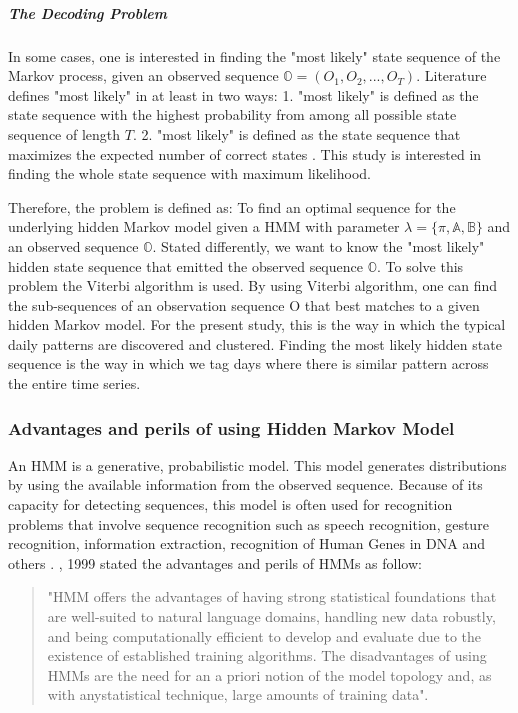 \subparagraph{The Decoding Problem}
\label{sec:decoding_HMM}

In some cases, one is interested in finding the "most likely" state sequence of the Markov process, given an observed sequence $\mathbb{O} = (O_1,O_2, ...,O_T ) $. Literature defines "most likely" in at least in two ways: 1. "most likely" is defined as the state sequence with the highest probability from among all possible state sequence of length $T$. 2. "most likely" is defined as the state sequence that maximizes the expected number of correct states \cite{stamp2004revealing}. This study is interested in finding the whole state sequence with maximum likelihood. 

Therefore, the problem is defined as: To find an optimal sequence for the underlying hidden Markov model given a HMM with parameter $\lambda = \{\pi, \mathbb{A}, \mathbb{B} \}$ and an observed sequence $\mathbb{O}$. Stated differently, we want to know the "most likely" hidden state sequence that emitted the observed sequence $\mathbb{O}$. To solve this problem the Viterbi algorithm is used. By using Viterbi algorithm, one can find the sub-sequences of an observation sequence O that best matches to a given hidden Markov model. For the present study, this is the way in which the typical daily patterns are discovered and clustered. Finding the most likely hidden state sequence is the way in which we tag days where there is similar pattern across the entire time series.

 
\subsubsection{Advantages and perils of using Hidden Markov Model}

An HMM is a generative, probabilistic model. This model generates distributions by using the available information from the observed sequence. Because of its capacity for detecting sequences, this model is often used for recognition problems that involve sequence recognition such as speech recognition, gesture recognition, information extraction, recognition of Human Genes in DNA and others \cite{ramage2007hidden, seymore1999learning, haussler1996generalized}. \citeauthor{seymore1999learning}, 1999 \cite{seymore1999learning} stated the advantages and perils of HMMs as follow: 

\begin{quote}
"HMM offers the advantages of having strong statistical foundations that are well-suited to natural language domains, handling new data robustly, and being computationally efficient to develop and evaluate due to the existence of established training algorithms. The disadvantages of using HMMs are the need for an a priori notion of the model topology and, as with anystatistical technique, large amounts of training data".
\end{quote}

